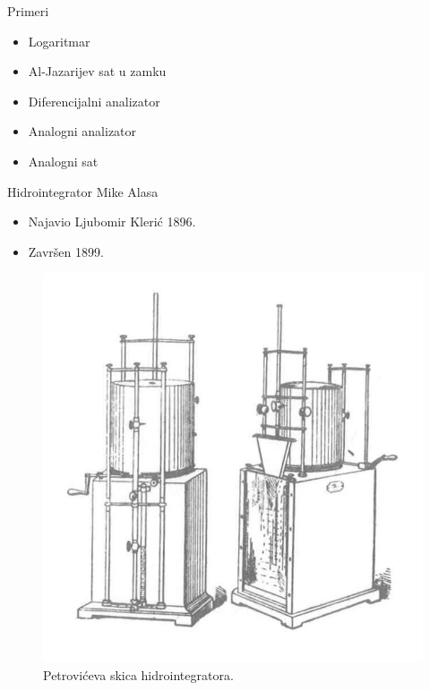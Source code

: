 \documentclass[14pt]{beamer}
\begin{document}
\begin{frame}{Primeri}
	\begin{itemize}
		\item Logaritmar
		\item Al-Jazarijev sat u zamku
 		\item Diferencijalni analizator
		\item Analogni analizator
		\item Analogni sat
	\end{itemize}
\end{frame}

\begin{frame}{Hidrointegrator Mike Alasa}
\begin{itemize}
    \item Najavio Ljubomir Klerić 1896.
    \item Završen 1899.
\end{itemize}
\begin{figure}[h!]
\begin{center}
\includegraphics[scale=0.6]{h1.jpg}
\end{center}
\caption{Petrovićeva skica hidrointegratora. }
\label{fig:h1}
\end{figure}
    
\end{frame}
\end{document}
